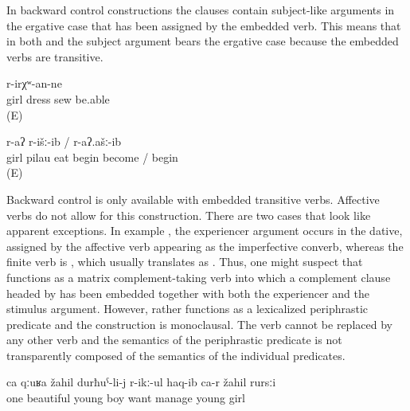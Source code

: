In backward control constructions the clauses contain subject-like arguments in the ergative case that has been assigned by the embedded verb. This means that in both  and  the subject argument bears the ergative case because the embedded verbs are transitive.
%
\begin{exe}
	\ex	\label{ex:‎The girl will be able to sew the dress}
		r-irχʷ-an-ne\\
		girl	dress	sew	be.able\\
	\glt	{} (E)

	\ex	\label{ex:‎The girl began to eat the pilau}
		r-aʔ	r-išː-ib	/	r-aʔ.ašː-ib\\
		girl pilau	eat \tsc{f-}begin	become	/ begin\\
	\glt	{} (E)
\end{exe}

Backward control is only available with embedded transitive verbs. Affective verbs do not allow for this construction. There are two cases that look like apparent exceptions. In example , the experiencer argument occurs in the dative, assigned by the affective verb   appearing as the imperfective converb, whereas the finite verb is , which usually translates as . Thus, one might suspect that  functions as a matrix complement-taking verb into which a complement clause headed by  has been embedded together with both the experiencer and the stimulus argument. However,  rather functions as a lexicalized periphrastic predicate and the construction is monoclausal. The verb  cannot be replaced by any other verb and the semantics of the periphrastic predicate is not transparently composed of the semantics of the individual predicates.
%
\begin{exe}
	\ex	\label{ex:‎One beautiful young man fell in love with a young girl}
	\gll	ca	qːuʁa	žahil	durħuˁ-li-j	r-ikː-ul	haq-ib	ca-r	žahil	rursːi\\
		one	beautiful	young	boy	want	manage		young	girl\\
	\glt	{} 
\end{exe}

